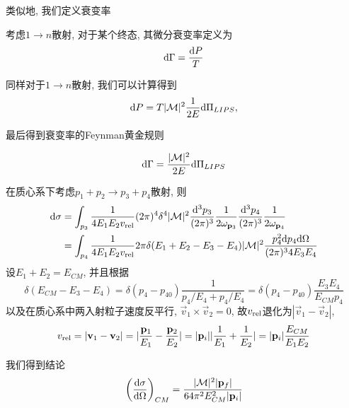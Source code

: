 类似地, 我们定义衰变率
\begin{definition}
    考虑$1\rightarrow n$散射, 对于某个终态, 其微分衰变率定义为
    \begin{equation}
        \d\Gamma=\frac{\d P}T
    \end{equation}
\end{definition}

同样对于$1\rightarrow n$散射, 我们可以计算得到
\begin{equation}
    \d P=T|\mathcal M|^2\frac1{2E}\d\Pi_{LIPS},
\end{equation}

最后得到衰变率的Feynman黄金规则
\begin{theorem}[衰变率的Feynman黄金规则]
    \begin{equation}
        \d\Gamma=\frac{|\mathcal M|^2}{2E}\d\Pi_{LIPS}
    \end{equation}
\end{theorem}

\begin{example}[$2\rightarrow2$散射]\label{ex-2-2-scattering}
    在质心系下考虑$p_1+p_2\rightarrow p_3+p_4$散射, 则
    \begin{align}
        \d\sigma&=\int_{p_3}\frac1{4E_1E_2v_{\rm{rel}}}\dpi4\delta^4|\mathcal M|^2\lips{p_3}\lips{p_4}\\
        &=\int_{p_4}\frac1{4E_1E_2v_{\rm{rel}}}2\pi\delta(E_1+E_2-E_3-E_4)|\mathcal M|^2 \frac{p_4^2\d p_4\d\Omega}{\dpi3 4E_3E_4}
    \end{align}
    设$E_1+E_2=E_{CM}$, 并且根据
    \begin{equation}
        \delta(E_{CM}-E_3-E_4)=\delta(p_4-p_{40})\frac1{p_4/E_4+p_4/E_4}=\delta(p_4-p_{40})\frac{E_3E_4}{E_{CM}p_4}
    \end{equation}
    以及在质心系中两入射粒子速度反平行, $\vec v_1\times\vec v_2=0$, 故$v_{\rm{rel}}$退化为$|\vec v_1-\vec v_2|$,
    \begin{equation}
        v_{\rm{rel}}=|\vec v_1-\vec v_2|=|\frac{\vec p_1}{E_1}-\frac{\vec p_2}{E_2}|=|\vec p_i||\frac1{E_1}+\frac1{E_2}|=|\vec p_i|\frac{E_{CM}}{E_1E_2}
    \end{equation}

    我们得到结论
    \begin{equation}
        \left(\frac{\d\sigma}{\d\Omega}\right)_{CM}=\frac{|\mathcal M|^2|\vec p_f|}{64\pi^2E_{CM}^2|\vec p_i|}
    \end{equation}
\end{example}

